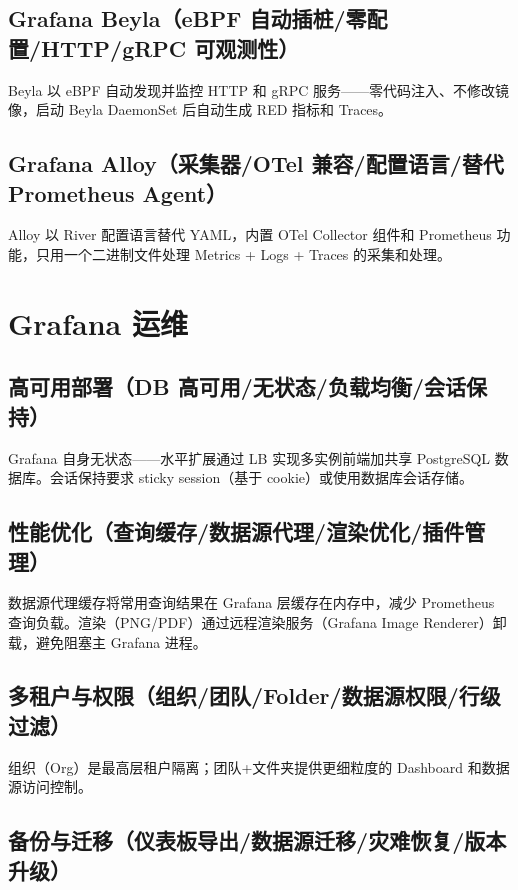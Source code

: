 \documentclass[12pt,UTF8]{ctexbook}
\begin{document}
    \subsection{Grafana Beyla（eBPF 自动插桩/零配置/HTTP/gRPC 可观测性）}

Beyla 以 eBPF 自动发现并监控 HTTP 和 gRPC 服务——零代码注入、不修改镜像，启动 Beyla DaemonSet 后自动生成 RED 指标和 Traces。

    \subsection{Grafana Alloy（采集器/OTel 兼容/配置语言/替代 Prometheus Agent）}

Alloy 以 River 配置语言替代 YAML，内置 OTel Collector 组件和 Prometheus 功能，只用一个二进制文件处理 Metrics + Logs + Traces 的采集和处理。

  \section{Grafana 运维}
    \subsection{高可用部署（DB 高可用/无状态/负载均衡/会话保持）}

Grafana 自身无状态——水平扩展通过 LB 实现多实例前端加共享 PostgreSQL 数据库。会话保持要求 sticky session（基于 cookie）或使用数据库会话存储。

    \subsection{性能优化（查询缓存/数据源代理/渲染优化/插件管理）}

数据源代理缓存将常用查询结果在 Grafana 层缓存在内存中，减少 Prometheus 查询负载。渲染（PNG/PDF）通过远程渲染服务（Grafana Image Renderer）卸载，避免阻塞主 Grafana 进程。

    \subsection{多租户与权限（组织/团队/Folder/数据源权限/行级过滤）}

组织（Org）是最高层租户隔离；团队+文件夹提供更细粒度的 Dashboard 和数据源访问控制。

    \subsection{备份与迁移（仪表板导出/数据源迁移/灾难恢复/版本升级）}
\end{document}
